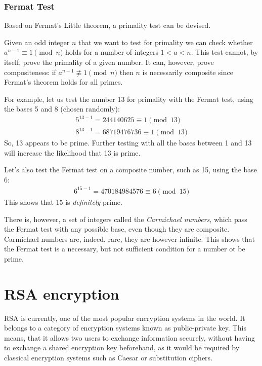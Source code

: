 \documentclass[12pt, titlepage]{article}
\let\oldsection\section
\renewcommand\section{\clearpage\oldsection}
\begin{document}
\subsubsection{Fermat Test}

Based on Fermat's Little theorem, a primality test can be devised.

Given an odd integer $n$ that we want to test for primality we can check whether $a^{n-1}
\equiv 1 \pmod{n}$ holds for a number of integers $1<a<n$.  This test cannot, by itself,
prove the primality of a given number. It can, however, prove compositeness: if $a^{n-1}
\not\equiv 1 \pmod{n}$ then $n$ is necessarily composite since Fermat's theorem holds for
all primes. \autocite{primality_akalin} 

For example, let us test the number 13 for primality with the Fermat test, using the bases 5
and 8 (chosen randomly):
%
\begin{align*}
    5^{13-1} = 244140625   \equiv 1 \pmod{13}\\
    8^{13-1} = 68719476736 \equiv 1 \pmod{13}
\end{align*}
%
So, 13 appears to be prime. Further testing with all the bases between 1 and 13 will
increase the likelihood that 13 is prime.

Let's also test the Fermat test on a composite number, such as 15, using the base 6:
%
\begin{align*}
    6^{15-1} = 470184984576 \equiv 6 \pmod{15}
\end{align*}
%
This shows that 15 is \emph{definitely} prime.

There is, however, a set of integers called the \emph{Carmichael numbers}, which pass the
Fermat test with any possible base, even though they are composite. Carmichael numbers are,
indeed, rare, they are however infinite. \autocite[116]{dence} This shows that the Fermat
test is a necessary, but not sufficient condition for a number ot be prime.

\section{RSA encryption}

RSA \autocite{rsa} is currently, one of the most popular encryption systems in the world.
It belongs to a category of encryption systems known as public-private key.  This means,
that it allows two users to exchange information securely, without having to exchange a
shared encryption key beforehand, as it would be required by classical encryption systems
such as Caesar or substitution ciphers. 
\end{document}
